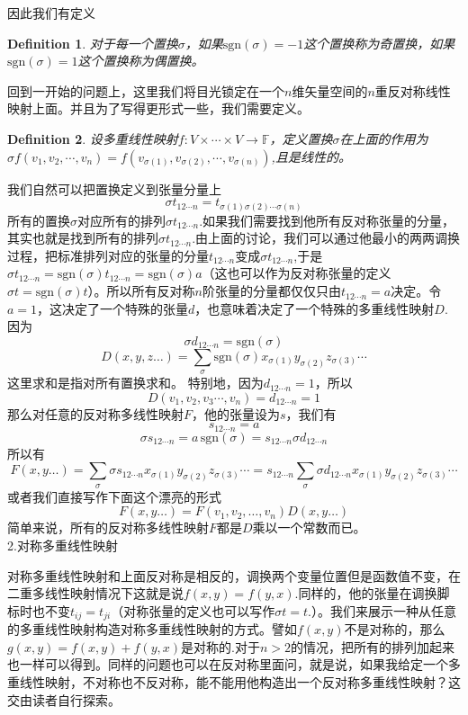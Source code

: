 \documentclass[11pt,a4paper,openany]{book}%
\theoremstyle{plain}%
\newtheorem{defi}{Definition}[chapter]%
\begin{document}
\noindent 因此我们有定义
\begin{defi}
对于每一个置换$\sigma$，如果$\mathrm{sgn}(\sigma)=-1$这个置换称为奇置换，如果$\mathrm{sgn}(\sigma)=1$这个置换称为偶置换。
\end{defi}
\indent 回到一开始的问题上，这里我们将目光锁定在一个$n$维矢量空间的$n$重反对称线性映射上面。并且为了写得更形式一些，我们需要定义。
\begin{defi}
设多重线性映射$f:V\times \cdots \times V\rightarrow \mathbb{F}$，定义置换$\sigma$在上面的作用为$\sigma f(v_1,v_2,\cdots,v_n)=f(v_{\sigma(1)},v_{\sigma(2)},\cdots,v_{\sigma(n)})$,且是线性的。
\end{defi}
我们自然可以把置换定义到张量分量上
\[
\sigma t_{12\cdots n}=t_{\sigma(1)\sigma(2)\cdots \sigma(n)}
\]
所有的置换$\sigma$对应所有的排列$\sigma t_{12\cdots n}$.如果我们需要找到他所有反对称张量的分量，其实也就是找到所有的排列$\sigma t_{12\cdots n}$.由上面的讨论，我们可以通过他最小的两两调换过程，把标准排列对应的张量的分量$t_{12\cdots n}$变成$\sigma t_{12\cdots n}$,于是$\sigma t_{12\cdots n}=\mathrm{sgn}(\sigma)t_{12\cdots n}=\mathrm{sgn}(\sigma)a$（这也可以作为反对称张量的定义$\sigma t= \mathrm{sgn}(\sigma)t$）。所以所有反对称$n$阶张量的分量都仅仅只由$t_{12\cdots n}=a$决定。令$a=1$，这决定了一个特殊的张量$d$，也意味着决定了一个特殊的多重线性映射$D$.
因为
\[
\sigma d_{12\cdots n}=\mathrm{sgn}(\sigma)
\]
\[
D(x,y,z…)=\sum_{\sigma}\mathrm{sgn}(\sigma)x_{\sigma(1)}y_{\sigma(2)}z_{\sigma(3)}\cdots
\]
这里求和是指对所有置换求和。
特别地，因为$d_{12\cdots n}=1$，所以
\[
D(v_1,v_2,v_3\cdots ,v_n)=d_{12\cdots n}=1
\]
那么对任意的反对称多线性映射$F$，他的张量设为$s$，我们有
\[
s_{12\cdots n}=a
\]
\[
\sigma s_{12\cdots n}=a\,\mathrm{sgn}(\sigma)=s_{12\cdots n}\sigma d_{12\cdots n}
\]
所以有
\[
F(x,y…)=\sum_{\sigma}\sigma s_{12\cdots n}x_{\sigma(1)}y_{\sigma(2)}z_{\sigma(3)}\cdots=s_{12\cdots n}\sum_{\sigma}\sigma d_{12\cdots n}x_{\sigma(1)}y_{\sigma(2)}z_{\sigma(3)}\cdots
\]
或者我们直接写作下面这个漂亮的形式
\begin{equation}
\label{a2}
F(x,y…)=F(v_1,v_2,…,v_n)D(x,y…)
\end{equation}
简单来说，所有的反对称多线性映射$F$都是$D$乘以一个常数而已。\\
2.对称多重线性映射

对称多重线性映射和上面反对称是相反的，调换两个变量位置但是函数值不变，在二重多线性映射情况下这就是说$f(x,y)=f(y,x)$.同样的，他的张量在调换脚标时也不变$t_{ij}=t_{ji}$（对称张量的定义也可以写作$\sigma t=t$.）。我们来展示一种从任意的多重线性映射构造对称多重线性映射的方式。譬如$f(x,y)$不是对称的，那么$g(x,y)=f(x,y)+f(y,x)$是对称的.对于$n>2$的情况，把所有的排列加起来也一样可以得到。同样的问题也可以在反对称里面问，就是说，如果我给定一个多重线性映射，不对称也不反对称，能不能用他构造出一个反对称多重线性映射？这交由读者自行探索。
\end{document}
